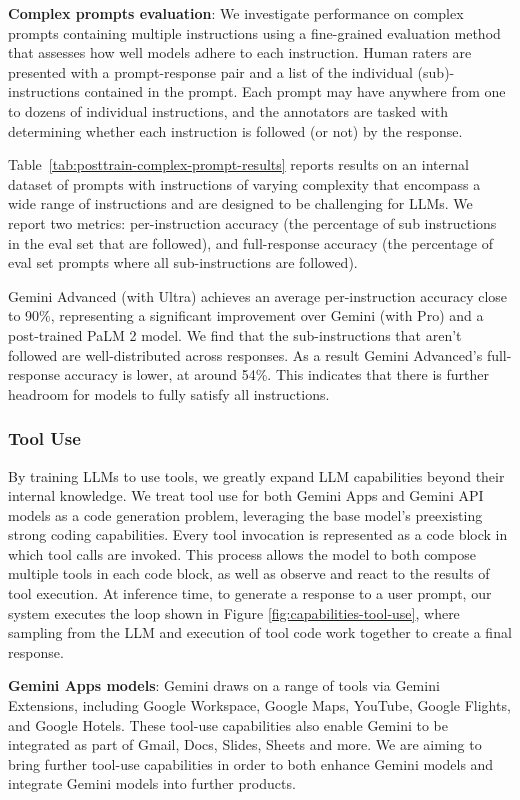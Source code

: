 \textbf{Complex prompts evaluation}: We investigate performance on complex prompts containing multiple instructions using a fine-grained evaluation method that assesses how well models adhere to each instruction. Human raters are presented with a prompt-response pair and a list of the individual (sub)-instructions contained in the prompt. Each prompt may have anywhere from one to dozens of individual instructions, and the annotators are tasked with determining whether each instruction is followed (or not) by the response.

Table~\ref{tab:posttrain-complex-prompt-results} reports results on an internal dataset of prompts with instructions of varying complexity that encompass a wide range of instructions and are designed to be challenging for LLMs. We report two metrics: per-instruction accuracy (the percentage of sub instructions in the eval set that are followed), and full-response accuracy (the percentage of eval set prompts where all sub-instructions are followed).

Gemini Advanced (with Ultra) achieves an average per-instruction accuracy close to 90\%, representing a significant improvement over Gemini (with Pro) and a post-trained PaLM 2 model. We find that the sub-instructions that aren’t followed are well-distributed across responses. As a result Gemini Advanced’s full-response accuracy is lower, at around 54\%. This indicates that there is further headroom for models to fully satisfy all instructions.

\subsubsection{Tool Use}

By training LLMs to use tools, we greatly expand LLM capabilities beyond their internal knowledge. We treat tool use for both Gemini Apps and Gemini API models as a code generation problem, leveraging the base model’s preexisting strong coding capabilities. Every tool invocation is represented as a code block in which tool calls are invoked. This process allows the model to both compose multiple tools in each code block, as well as observe and react to the results of tool execution. At inference time, to generate a response to a user prompt, our system executes the loop shown in Figure \ref{fig:capabilities-tool-use}, where sampling from the LLM and execution of tool code work together to create a final response.

\textbf{Gemini Apps models}: Gemini draws on a range of tools via Gemini Extensions, including Google Workspace, Google Maps, YouTube, Google Flights, and Google Hotels. These tool-use capabilities also enable Gemini to be integrated as part of Gmail, Docs, Slides, Sheets and more. We are aiming to bring further tool-use capabilities in order to both enhance Gemini models and integrate Gemini models into further products.


